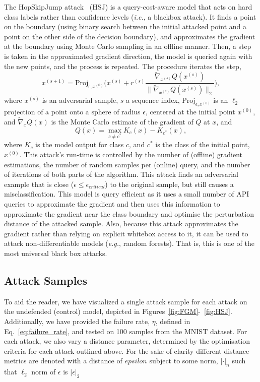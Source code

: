 \documentclass[journal]{IEEEtran}
\begin{document}
The HopSkipJump attack~\cite{hopskipjump} (HSJ) is a query-cost-aware model that acts on hard class labels rather than confidence levels (\textit{i.e.}, a blackbox attack).
It finds a point on the boundary (using binary search between the initial attacked point and a point on the other side of the decision boundary), and approximates the gradient at the boundary using Monte Carlo sampling in an offline manner.
Then, a step is taken in the approximated gradient direction, the model is queried again with the new points, and the process is repeated.
The procedure iterates the step,
$$
   x^{(s+1)} = \mathrm{Proj}_{\epsilon,x^{(0)}}\Bigg( x^{(s)} + r^{(s)} \frac{\widetilde{\nabla}_{x^{(s)}}  Q(x^{(s)}) }{\big\|\widetilde{\nabla}_{x^{(s)}} Q(x^{(s)}) \big\|_2}\Bigg),
$$
where $x^{(s)}$ is an adversarial sample, $s$ a sequence index, $\mathrm{Proj}_{\epsilon,x^{(0)}}$ is an $\ell_2$ projection of a point onto a sphere of radius $\epsilon$, centered at the initial point $x^{(0)}$, and $\widetilde{\nabla}_x{Q(x)}$ is the Monte Carlo estimate of the gradient of $Q$ at $x$, and
$$
    Q(x) = \max_{c\neq c^*} K_c(x) - K_{c^*}(x),
$$
where $K_{c}$ is the model output for class $c$, and $c^*$ is the class of the initial point, $x^{(0)}$.
This attack's run-time is controlled by the number of (offline) gradient estimations, the number of random samples per (online) query, and the number of iterations of both parts of the algorithm.
This attack finds an adversarial example that is close ($\epsilon \leq \epsilon_{critical}$) to the original sample, but still causes a misclassification.
This model is query efficient as it uses a small number of API queries to approximate the gradient and then uses this information to approximate the gradient near the class boundary and optimise the perturbation distance of the attacked sample.
Also, because this attack approximates the gradient rather than relying on explicit whitebox access to it, it can be used to attack non-differentiable models (\textit{e.g.}, random forests).
That is, this is one of the most universal black box attacks.

\subsection{Attack Samples}
To aid the reader, we have visualized a single attack sample for each attack on the undefended (control) model, depicted in Figures~\ref{fig:FGM}-~\ref{fig:HSJ}.
Additionally, we have provided the failure rate, $\eta$, defined in Eq.~\ref{eq:failure_rate}, and tested on 100 samples from the MNIST dataset.
For each attack, we also vary a distance parameter, determined by the optimisation criteria for each attack outlined above.
For the sake of clarity different distance metrics are denoted with a distance of $epsilon$ subject to some norm, $| \cdot |_n$ such that $\ell_2$ norm of ${\epsilon}$ is $ | \epsilon |_2$
\end{document}
